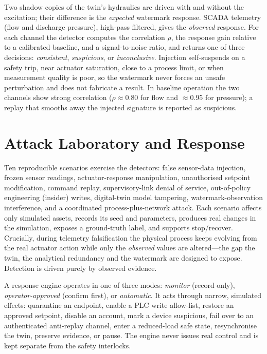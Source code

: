 \documentclass[conference]{IEEEtran}
\begin{document}
Two shadow copies of the twin's hydraulics are driven with and without the excitation; their difference is the \emph{expected} watermark response. SCADA telemetry (flow and discharge pressure), high-pass filtered, gives the \emph{observed} response. For each channel the detector computes the correlation $\rho$, the response gain relative to a calibrated baseline, and a signal-to-noise ratio, and returns one of three decisions: \textit{consistent}, \textit{suspicious}, or \textit{inconclusive}. Injection self-suspends on a safety trip, near actuator saturation, close to a process limit, or when measurement quality is poor, so the watermark never forces an unsafe perturbation and does not fabricate a result. In baseline operation the two channels show strong correlation ($\rho\approx0.80$ for flow and $\approx0.95$ for pressure); a replay that smooths away the injected signature is reported as suspicious.

\section{Attack Laboratory and Response}
Ten reproducible scenarios exercise the detectors: false sensor-data injection, frozen sensor readings, actuator-response manipulation, unauthorised setpoint modification, command replay, supervisory-link denial of service, out-of-policy engineering (insider) writes, digital-twin model tampering, watermark-observation interference, and a coordinated process-plus-network attack. Each scenario affects only simulated assets, records its seed and parameters, produces real changes in the simulation, exposes a ground-truth label, and supports stop/recover. Crucially, during telemetry falsification the physical process keeps evolving from the real actuator action while only the \emph{observed} values are altered---the gap the twin, the analytical redundancy and the watermark are designed to expose. Detection is driven purely by observed evidence.

A response engine operates in one of three modes: \textit{monitor} (record only), \textit{operator-approved} (confirm first), or \textit{automatic}. It acts through narrow, simulated effects: quarantine an endpoint, enable a PLC write allow-list, restore an approved setpoint, disable an account, mark a device suspicious, fail over to an authenticated anti-replay channel, enter a reduced-load safe state, resynchronise the twin, preserve evidence, or pause. The engine never issues real control and is kept separate from the safety interlocks.
\end{document}
